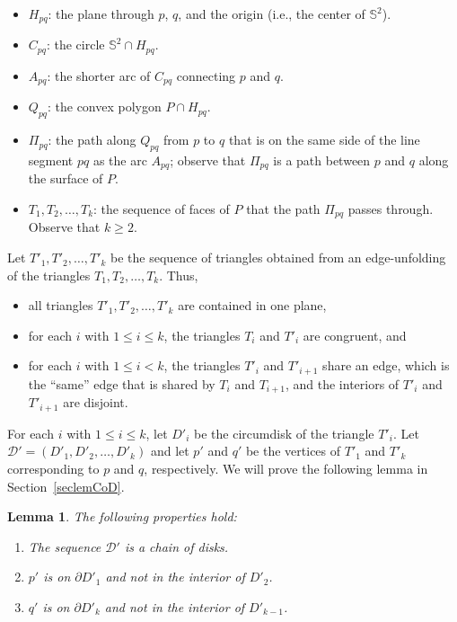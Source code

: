 \documentclass[12pt]{article}
\newtheorem{lemma}{Lemma}
\newcommand{\IS}{\mathbb{S}}
\begin{document}
\begin{itemize} 
\item $H_{pq}$: the plane through $p$, $q$, and the origin (i.e., the 
      center of $\IS^2$). 
\item $C_{pq}$: the circle $\IS^2 \cap H_{pq}$. 
\item $A_{pq}$: the shorter arc of $C_{pq}$ connecting $p$ and $q$. 
\item $Q_{pq}$: the convex polygon $P \cap H_{pq}$. 
\item $\Pi_{pq}$: the path along $Q_{pq}$ from $p$ to $q$ that is on 
      the same side of the line segment $pq$ as the arc $A_{pq}$; 
      observe that $\Pi_{pq}$ is a path between $p$ and $q$ along the 
      surface of $P$. 
\item $T_1,T_2,\ldots,T_k$: the sequence of faces of $P$ that the path 
      $\Pi_{pq}$ passes through. Observe that $k \geq 2$.
\end{itemize} 
Let $T'_1,T'_2,\ldots,T'_k$ be the sequence of triangles obtained from 
an edge-unfolding of the triangles $T_1,T_2,\ldots,T_k$. Thus, 
\begin{itemize}
\item all triangles $T'_1,T'_2,\ldots,T'_k$ are contained in one plane, 
\item for each $i$ with $1 \leq i \leq k$, the triangles $T_i$ and $T'_i$ 
      are congruent, and 
\item for each $i$ with $1 \leq i < k$, the triangles $T'_i$ and 
      $T'_{i+1}$ share an edge, which is the ``same'' edge that is shared 
      by $T_i$ and $T_{i+1}$, and the interiors of $T'_i$ and $T'_{i+1}$ 
      are disjoint.  
\end{itemize} 
For each $i$ with $1 \leq i \leq k$, let $D'_i$ be the circumdisk of the 
triangle $T'_i$. Let $\mathcal{D'} = (D'_1,D'_2,\ldots,D'_k)$ and let 
$p'$ and $q'$ be the vertices of $T'_1$ and $T'_k$ corresponding to $p$ 
and $q$, respectively. We will prove the following lemma in 
Section~\ref{seclemCoD}.  

\begin{lemma}  \label{lemCoD}  
The following properties hold: 
\begin{enumerate} 
\item The sequence $\mathcal{D'}$ is a chain of disks. 
\item $p'$ is on $\partial D'_1$ and not in the interior of $D'_2$. 
\item $q'$ is on $\partial D'_k$ and not in the interior of $D'_{k-1}$.  
\end{enumerate} 
\end{lemma} 
\end{document}
